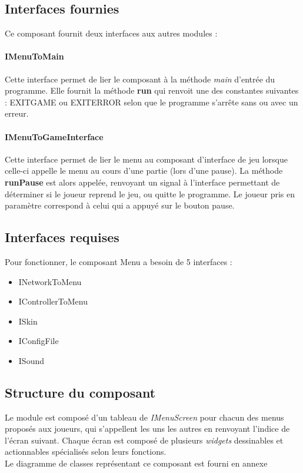 \subsection{Interfaces fournies}

Ce composant fournit deux interfaces aux autres modules :

\paragraph{IMenuToMain}

Cette interface permet de lier le composant à la méthode \textit{main} d'entrée du programme. Elle fournit la méthode \textbf{run} qui renvoit une des constantes suivantes : EXITGAME ou EXITERROR selon que le programme s'arrête sans ou avec un erreur.

\paragraph{IMenuToGameInterface}

Cette interface permet de lier le menu au composant d'interface de jeu lorsque celle-ci appelle le menu au cours d'une partie (lors d'une pause). La méthode \textbf{runPause} est alors appelée, renvoyant un signal à l'interface permettant de déterminer si le joueur reprend le jeu, ou quitte le programme. Le joueur pris en paramètre correspond à celui qui a appuyé sur le bouton pause.

\subsection{Interfaces requises}

Pour fonctionner, le composant Menu a besoin de 5 interfaces :
\begin{itemize}
    \item INetworkToMenu
    \item IControllerToMenu
    \item ISkin
    \item IConfigFile
    \item ISound    
\end{itemize}

\subsection{Structure du composant}

Le module est composé d'un tableau de \textit{IMenuScreen} pour chacun des menus proposés aux joueurs, qui s'appellent les uns les autres en renvoyant l'indice de l'écran suivant. Chaque écran est composé de plusieurs \textit{widgets} dessinables et actionnables spécialisés selon leurs fonctions.\\

Le diagramme de classes représentant ce composant est fourni en annexe

